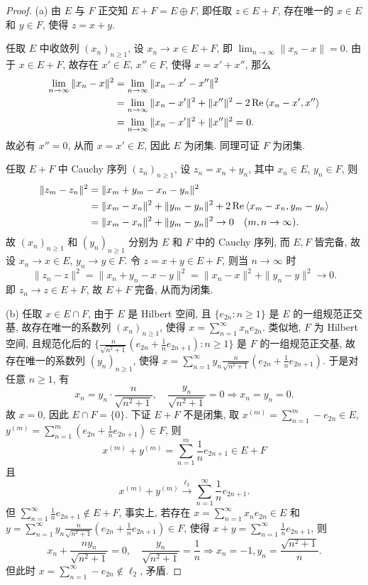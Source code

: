\begin{proof}
    (a) 由 $E$ 与 $F$ 正交知 $E+F=E\oplus F$, 即任取 $z\in E+F$,
    存在唯一的 $x\in E$ 和 $y\in F$, 使得 $z=x+y$.

    \necessary
    任取 $E$ 中收敛列 $(x_n)_{n\geq 1}$, 设 $x_n\to x\in E+F$,
    即 $\lim_{n\to\infty}\|x_n-x\|=0$. 由于 $x\in E+F$, 故存在 $x'\in E$, $x''\in F$,
    使得 $x=x'+x''$, 那么
    \begin{align*}
        \lim_{n\to\infty}\|x_n-x\|^2
        & =\lim_{n\to\infty}\|x_n-x'-x''\|^2 \\
        & =\lim_{n\to\infty}\|x_n-x'\|^2+\|x''\|^2-2\operatorname{Re}\left\langle x_n-x',x''\right\rangle \\
        & =\lim_{n\to\infty}\|x_n-x'\|^2+\|x''\|^2=0.
    \end{align*}
    故必有 $x''=0$, 从而 $x=x'\in E$, 因此 $E$ 为闭集. 同理可证 $F$ 为闭集.

    \sufficient
    任取 $E+F$ 中 Cauchy 序列 $(z_n)_{n\geq 1}$, 设 $z_n=x_n+y_n$, 其中 $x_n\in E$, $y_n\in F$, 则
    \begin{align*}
        \|z_m-z_n\|^2
        & =\|x_m+y_m-x_n-y_n\|^2 \\
        & =\|x_m-x_n\|^2+\|y_m-y_n\|^2+2\operatorname{Re}\left\langle x_m-x_n,y_m-y_n\right\rangle \\
        & =\|x_m-x_n\|^2+\|y_m-y_n\|^2\to 0\quad (m,n\to\infty).
    \end{align*}
    故 $(x_n)_{n\geq 1}$ 和 $(y_n)_{n\geq 1}$ 分别为 $E$ 和 $F$ 中的 Cauchy 序列,
    而 $E,F$ 皆完备, 故设 $x_n\to x\in E$, $y_n\to y\in F$.
    令 $z=x+y\in E+F$, 则当 $n\to\infty$ 时
    \[\|z_n-z\|^2=\|x_n+y_n-x-y\|^2=\|x_n-x\|^2+\|y_n-y\|^2\to 0.\]
    即 $z_n\to z\in E+F$, 故 $E+F$ 完备, 从而为闭集.

    (b) 任取 $x\in E\cap F$, 由于 $E$ 是 Hilbert 空间, 且
    $\{e_{2n}:n\geq 1\}$ 是 $E$ 的一组规范正交基, 故存在唯一的系数列 $(x_n)_{n\geq 1}$,
    使得 $x=\sum_{n=1}^{\infty}x_n e_{2n}$. 类似地, $F$ 为 Hilbert 空间, 且规范化后的
    $\{\frac{n}{\sqrt{n^2+1}}(e_{2n}+\frac{1}{n}e_{2n+1}):n\geq 1\}$ 是 $F$ 的一组规范正交基,
    故存在唯一的系数列 $(y_n)_{n\geq 1}$, 
    使得 $x=\sum_{n=1}^{\infty}y_n\frac{n}{\sqrt{n^2+1}}(e_{2n}+\frac{1}{n}e_{2n+1})$.
    于是对任意 $n\geq 1$, 有
    \[x_n=y_n\cdot\frac{n}{\sqrt{n^2+1}},\quad\frac{y_n}{\sqrt{n^2+1}}=0\Longrightarrow x_n=y_n=0.\]
    故 $x=0$, 因此 $E\cap F=\{0\}$. 下证 $E+F$ 不是闭集,
    取 $x^{(m)}=\sum_{n=1}^m -e_{2n}\in E$, $y^{(m)}=\sum_{n=1}^m (e_{2n}+\frac{1}{n}e_{2n+1})\in F$,
    则
    \[x^{(m)}+y^{(m)}=\sum_{n=1}^m \frac{1}{n}e_{2n+1}\in E+F\]
    且
    \[x^{(m)}+y^{(m)}\xrightarrow{\ell_2}\sum_{n=1}^{\infty}\frac{1}{n}e_{2n+1}.\]
    但 $\sum_{n=1}^{\infty}\frac{1}{n}e_{2n+1}\notin E+F$, 事实上, 若存在
    $x=\sum_{n=1}^{\infty}x_n e_{2n}\in E$ 和 $y=\sum_{n=1}^{\infty}y_n\frac{n}{\sqrt{n^2+1}}(e_{2n}+\frac{1}{n}e_{2n+1})\in F$,
    使得 $x+y=\sum_{n=1}^{\infty}\frac{1}{n}e_{2n+1}$, 则
    \[x_n+\frac{ny_n}{\sqrt{n^2+1}}=0,\quad\frac{y_n}{\sqrt{n^2+1}}=\frac{1}{n}\Longrightarrow x_n=-1,y_n=\frac{\sqrt{n^2+1}}{n}.\]
    但此时 $x=\sum_{n=1}^{\infty}-e_{2n}\notin\ell_2$, 矛盾.
\end{proof}



